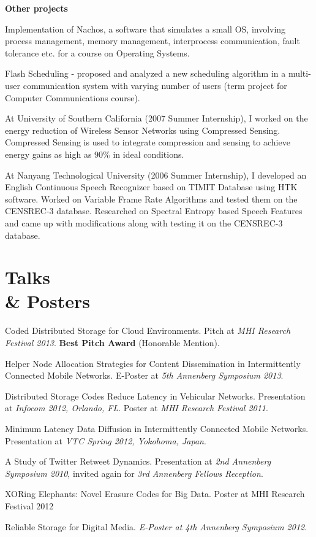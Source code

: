 \documentclass[margin,line]{resume}
\begin{document}
\begin{resume}
  \textbf{Other projects} 
  \begin{list2}   
   \item Implementation of Nachos, a software that simulates a small OS, involving process management, memory management, interprocess communication, fault tolerance etc. for a course on Operating Systems.
   \item Flash Scheduling - proposed and analyzed a new scheduling algorithm in a multi-user communication system with varying number of users (term project for Computer Communications course).
   \item At University of Southern California (2007 Summer Internship), I worked on the energy reduction of Wireless Sensor Networks using Compressed Sensing. Compressed Sensing is used to integrate compression and sensing to achieve energy gains as high as 90\% in ideal conditions.
   \item At Nanyang Technological University (2006 Summer Internship), I developed an English Continuous Speech Recognizer based on TIMIT Database using HTK software. Worked on Variable Frame Rate Algorithms and tested them on the CENSREC-3 database. Researched on Spectral Entropy based Speech Features and came up with modifications along with testing it on the CENSREC-3 database.
  \end{list2}


 \section{\mysidestyle Talks \\ \& Posters} 
  \begin{list2}
  \item Coded Distributed Storage for Cloud Environments. Pitch at \textsl{MHI Research Festival 2013}. \textbf{Best Pitch Award} (Honorable Mention).  
   \item Helper Node Allocation Strategies for Content Dissemination in Intermittently Connected Mobile Networks. E-Poster at \textsl{5th Annenberg Symposium 2013}. 
   \item Distributed Storage Codes Reduce Latency in Vehicular Networks. Presentation at \textsl{Infocom 2012, Orlando, FL}. Poster at \textsl{MHI Research Festival 2011}.
   \item Minimum Latency Data Diffusion in Intermittently Connected Mobile Networks. Presentation at \textsl{VTC Spring 2012, Yokohoma, Japan}.   
   \item A Study of Twitter Retweet Dynamics. Presentation at \textsl{2nd Annenberg Symposium 2010}, invited again for \textsl{3rd Annenberg Fellows Reception}.
   \item XORing Elephants: Novel Erasure Codes for Big Data. Poster at MHI Research Festival 2012
   \item Reliable Storage for Digital Media. \textsl{E-Poster at 4th Annenberg Symposium 2012}. 
   \end{list2}	
   

\end{resume}
\end{document}
